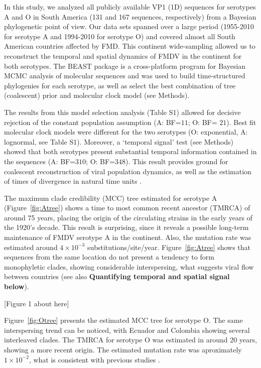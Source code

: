 \documentclass[10pt]{article}
\begin{document}
In this study, we analyzed all publicly available VP1 (1D) sequences for serotypes A and O in South America (131 and 167 sequences, respectively) from a Bayesian phylogenetic point of view. Our data sets spanned over a large period (1955-2010 for serotype A and 1994-2010 for serotype O)  and covered almost all South American countries affected by FMD. This continent wide-sampling allowed us to reconstruct the temporal and spatial dynamics of FMDV in the continent for both serotypes. The BEAST \cite{BEAST} package is a  cross-platform program for Bayesian MCMC analysis of molecular sequences and was used to build time-structured phylogenies for each serotype, as well as select the best combination of tree (coalescent) prior and molecular clock model (see Methods). 

The results from this model selection analysis (Table S1) allowed for decisive rejection of the constant population assumption (A: BF=$11$; O: BF= $21$). Best fit molecular clock models were different for the two serotypes (O: exponential, A: lognormal, see Table S1). Moreover, a `temporal signal' test (see Methods) showed that both serotypes present substantial temporal information contained in the sequences (A: BF=$310$; O: BF=$348$). This result provides ground for coalescent reconstruction of viral population dynamics, as well as the estimation of times of divergence in natural time units \cite{MEP}.

The maximum clade credibility (MCC) tree estimated for serotype A (Figure~\ref{fig:Atree}) shows a time to most common recent ancestor (TMRCA) of around 75 years, placing the origin of the circulating strains in the early years of the 1920's decade. This result is surprising, since it reveals a possible long-term maintenance of FMDV serotype A in the continent. Also, the mutation rate was estimated around $4 \times 10^{-3}$ substitutions/site/year. Figure~\ref{fig:Atree} shows that sequences from the same location do not present a tendency to form monophyletic clades, showing considerable interspersing, what suggests viral flow between countries (see also \textbf{Quantifying temporal and spatial signal below}).

\begin{center}
 [Figure 1 about here]
\end{center}

Figure~\ref{fig:Otree} presents the estimated MCC tree for serotype O. The same interspersing trend can be noticed, with Ecuador and Colombia showing several interleaved clades. The TMRCA for serotype O was estimated in around 20 years, showing a more recent origin. The estimated mutation rate was aproximately $1 \times 10^{-2}$, what is consistent with previous studies \cite{review,Carvalho2012}. 
\end{document}
